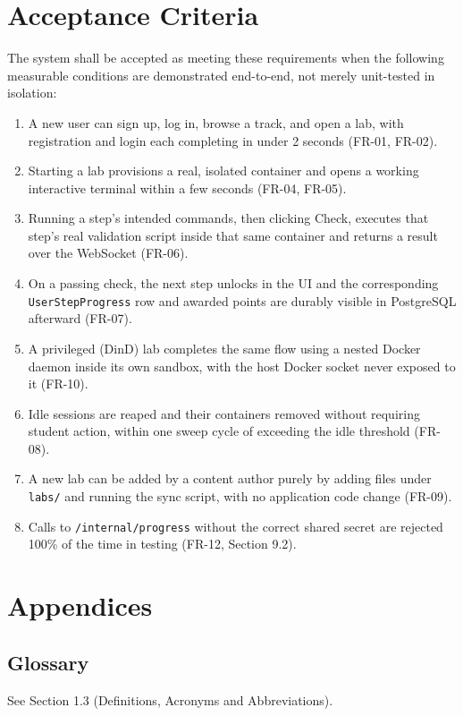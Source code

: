\documentclass[11pt]{article}
\begin{document}
\section{Acceptance Criteria}
The system shall be accepted as meeting these requirements when the
following measurable conditions are demonstrated end-to-end, not
merely unit-tested in isolation:
\begin{enumerate}
\item A new user can sign up, log in, browse a track, and open a lab,
      with registration and login each completing in under 2 seconds
      (FR-01, FR-02).
\item Starting a lab provisions a real, isolated container and opens a
      working interactive terminal within a few seconds (FR-04, FR-05).
\item Running a step's intended commands, then clicking Check,
      executes that step's real validation script inside that same
      container and returns a result over the WebSocket (FR-06).
\item On a passing check, the next step unlocks in the UI and the
      corresponding \texttt{UserStepProgress} row and awarded points
      are durably visible in PostgreSQL afterward (FR-07).
\item A privileged (DinD) lab completes the same flow using a nested
      Docker daemon inside its own sandbox, with the host Docker
      socket never exposed to it (FR-10).
\item Idle sessions are reaped and their containers removed without
      requiring student action, within one sweep cycle of exceeding
      the idle threshold (FR-08).
\item A new lab can be added by a content author purely by adding
      files under \texttt{labs/} and running the sync script, with no
      application code change (FR-09).
\item Calls to \texttt{/internal/progress} without the correct shared
      secret are rejected 100\% of the time in testing (FR-12,
      Section 9.2).
\end{enumerate}

\section{Appendices}

\subsection{Glossary}
See Section 1.3 (Definitions, Acronyms and Abbreviations).
\end{document}
